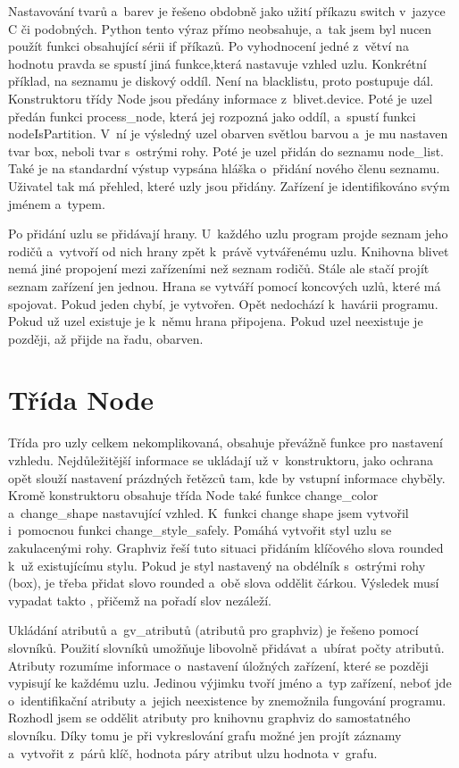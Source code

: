 \documentclass[color,table,oneside,nolot,nolof]{fithesis}
\begin{document}
	Nastavování tvarů a~barev je řešeno obdobně jako užití příkazu switch v~jazyce C či podobných. Python tento výraz přímo neobsahuje, a~tak jsem byl nucen použít funkci obsahující 
	sérii if příkazů. Po vyhodnocení jedné z~větví na hodnotu pravda se spustí jiná funkce,která nastavuje vzhled uzlu. Konkrétní příklad, na seznamu je diskový oddíl. Není na blacklistu,
	proto postupuje dál. Konstruktoru třídy Node jsou předány informace z~blivet.device. Poté je uzel předán funkci process\_node, která jej rozpozná jako oddíl, a~spustí funkci 
	nodeIsPartition. V~ní je výsledný uzel obarven světlou barvou a~je mu nastaven tvar box, neboli tvar s~ostrými rohy. Poté je uzel přidán do seznamu node\_list. Také je na
	standardní výstup vypsána hláška o~přidání nového členu seznamu. Uživatel tak má přehled, které uzly jsou přidány. Zařízení je identifikováno svým jménem a~typem.

	Po přidání uzlu se přidávají hrany. U~každého uzlu program projde seznam jeho rodičů a~vytvoří od nich hrany zpět k~právě vytvářenému uzlu. 
	Knihovna blivet nemá jiné propojení mezi zařízeními než seznam rodičů. Stále ale stačí projít seznam zařízení jen jednou. Hrana se vytváří pomocí koncových uzlů, které má spojovat.
	Pokud jeden chybí, je vytvořen. Opět nedochází k~havárii programu. Pokud už uzel existuje je k~němu hrana připojena. Pokud uzel neexistuje je později, až přijde na řadu, obarven.

\section{Třída Node}
	Třída pro uzly celkem nekomplikovaná, obsahuje převážně funkce pro nastavení vzhledu. Nejdůležitější informace se ukládají už v~konstruktoru, jako ochrana opět slouží nastavení
	prázdných řetězců tam, kde by vstupní informace chyběly. Kromě konstruktoru obsahuje třída Node také funkce change\_color a~change\_shape nastavující vzhled. K~funkci change shape 
	jsem vytvořil i~pomocnou funkci change\_style\_safely. Pomáhá vytvořit styl uzlu se zakulacenými rohy. Graphviz řeší tuto situaci přidáním klíčového slova rounded k~už 
	existujícímu stylu. Pokud je styl nastavený na obdélník s~ostrými rohy (box), je třeba přidat slovo rounded a~obě slova oddělit čárkou. Výsledek musí vypadat takto ,
	přičemž na pořadí slov nezáleží.

	Ukládání atributů a~gv\_atributů (atributů pro graphviz) je řešeno pomocí slovníků. Použití slovníků umožňuje libovolně přidávat a~ubírat počty atributů. 
	Atributy rozumíme informace o~nastavení úložných zařízení, které se později vypisují ke každému uzlu. Jedinou výjimku tvoří jméno a~typ zařízení, neboť jde
	o~identifikační atributy a~jejich neexistence by znemožnila fungování programu. Rozhodl jsem se oddělit atributy pro knihovnu graphviz do samostatného slovníku. Díky tomu je při
	vykreslování grafu možné jen projít záznamy a~vytvořit z~párů klíč, hodnota páry atribut ulzu hodnota v~grafu. 
\end{document}

